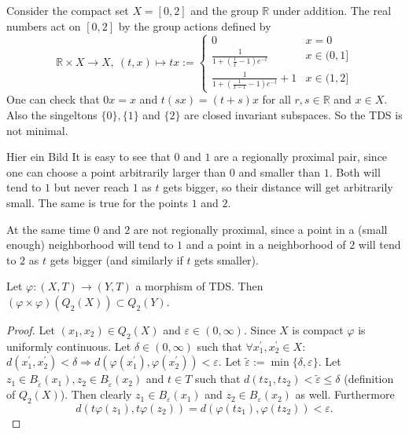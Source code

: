 \begin{example}
  Consider the compact set $X = [0, 2]$ and the group $\mathbb{R}$ under addition.
  The real numbers act on $[0, 2]$ by the group actions defined by
  \begin{equation*}
    \mathbb{R} \times X \to X, \ (t, x) \mapsto 
    tx := \begin{cases}
      0 & x = 0 \\
      \frac{1}{1 + (\frac{1}{x} - 1)e^{-t}} & x \in (0, 1] \\
      \frac{1}{1 + (\frac{1}{x - 1} - 1)e^{-t}} + 1 & x \in (1, 2]
    \end{cases}
  \end{equation*}
  One can check that $0x = x$ and $t(sx) = (t + s)x$ for all $r, s \in \mathbb{R}$ and $x \in X$.
  Also the singeltons $\{ 0 \}, \{ 1 \}$ and $\{ 2 \}$ are closed invariant subspaces.
  So the TDS is not minimal.

  {\color{red} Hier ein Bild}
  It is easy to see that $0$ and $1$ are a regionally proximal pair,
  since one can choose a point arbitrarily larger than $0$ and smaller than $1$.
  Both will tend to $1$ but never reach $1$ as $t$ gets bigger,
  so their distance will get arbitrarily small.
  The same is true for the points $1$ and $2$.

  At the same time $0$ and $2$ are not regionally proximal,
  since a point in a (small enough) neighborhood will tend to $1$ and a point in a neighborhood of $2$ will tend to $2$ as $t$ gets bigger
  (and similarly if $t$ gets smaller).
\end{example}
\begin{proposition}
  \label{prop:phiSqQ2XcQ2Y}
  Let $\varphi : (X,T) \to (Y,T)$ a morphism of TDS. Then $(\varphi \times \varphi) (Q_2 (X)) \subset Q_2(Y)$.
\end{proposition}
\begin{proof}
  Let $(x_1, x_2) \in Q_2(X)$ and $\varepsilon \in (0,\infty)$.
  Since $X$ is compact $\varphi$ is uniformly continuous.
  Let $\delta \in (0, \infty)$ such that $\forall x_1^\prime, x_2^\prime \in X:$ $d(x_1^\prime, x_2^\prime)<\delta \Rightarrow d(\varphi (x_1^\prime), \varphi(x_2^\prime)) < \varepsilon$.
  Let $\tilde{\varepsilon} := \min \{\delta, \varepsilon\}$.
  Let $z_1 \in B_{\tilde{\varepsilon}} (x_1), z_2 \in  B_{\tilde{\varepsilon}}(x_2)$ and $t \in T$ such that $d(t z_1, tz_2) < \tilde{\varepsilon} \leq \delta$ (definition of $Q_2(X)$).
  Then clearly $z_1 \in B_\varepsilon (x_1)$ and $z_2 \in B_\varepsilon  (x_2)$ as well.
  Furthermore
  \begin{equation*}
    d(t \varphi (z_1), t\varphi(z_2)) = d (\varphi ( t z_1) , \varphi (t z_2)) < \varepsilon.
  \end{equation*}
\end{proof}

